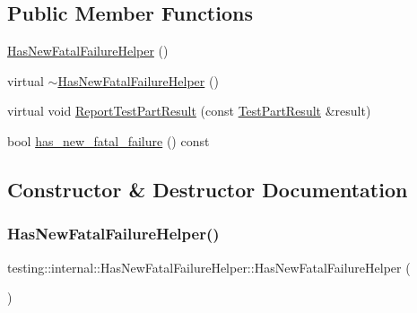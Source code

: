 \subsection*{Public Member Functions}
\begin{DoxyCompactItemize}
\item 
\hyperlink{classtesting_1_1internal_1_1_has_new_fatal_failure_helper_a59190a7188db558c00b4c6bf9251859a}{Has\+New\+Fatal\+Failure\+Helper} ()
\item 
virtual \hyperlink{classtesting_1_1internal_1_1_has_new_fatal_failure_helper_a913b1bc7c372868c9b2dbb009044ee97}{$\sim$\+Has\+New\+Fatal\+Failure\+Helper} ()
\item 
virtual void \hyperlink{classtesting_1_1internal_1_1_has_new_fatal_failure_helper_a2d2e1faa1f3669b82810df97ac678a27}{Report\+Test\+Part\+Result} (const \hyperlink{classtesting_1_1_test_part_result}{Test\+Part\+Result} \&result)
\item 
bool \hyperlink{classtesting_1_1internal_1_1_has_new_fatal_failure_helper_a91b7bac47f09076db4be0304a2110a9e}{has\+\_\+new\+\_\+fatal\+\_\+failure} () const
\end{DoxyCompactItemize}


\subsection{Constructor \& Destructor Documentation}
\mbox{\label{classtesting_1_1internal_1_1_has_new_fatal_failure_helper_a59190a7188db558c00b4c6bf9251859a}} 
\subsubsection{\texorpdfstring{Has\+New\+Fatal\+Failure\+Helper()}{HasNewFatalFailureHelper()}}
{\footnotesize\ttfamily testing\+::internal\+::\+Has\+New\+Fatal\+Failure\+Helper\+::\+Has\+New\+Fatal\+Failure\+Helper (\begin{DoxyParamCaption}{ }\end{DoxyParamCaption})}

